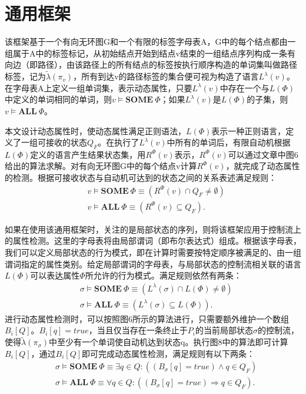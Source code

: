 \documentclass[UTF8]{article}
\begin{document}
\section{通用框架}
该框架基于一个有向无环图G和一个有限的标签字母表A，G中的每个结点都由一组属于A中的标签标记，从初始结点开始到结点v结束的一组结点序列构成一条有向边（即路径），由该路径上的所有结点的标签按执行顺序构造的单词集叫做路径标签，记为$ \tilde{\lambda}(\pi_v) $，所有到达v的路径标签的集合便可视为构造了语言$ L^{\lambda}(v) $。在字母表A上定义一组单词集，表示动态属性，只要$ L^{\lambda}(v) $中存在一个与$ L(\Phi) $中定义的单词相同的单词，则$ v \models \textbf{SOME} \ \Phi $；如果$ L^{\lambda}(v) $是$ L(\Phi) $的子集，则$ v \models \textbf{ALL} \ \Phi $。

本文设计动态属性时，使动态属性满足正则语法，$ L(\Phi) $表示一种正则语言，定义了一组可接收的状态$ Q_F $。在执行了$ L^{\lambda}(v) $中所有的单词后，有限自动机根据$ L(\Phi) $定义的语言产生结果状态集，用$ R^{\Phi}(v) $表示，$ R^{\Phi}(v) $可以通过文章中图6给出的算法求解。对有向无环图G中的每个结点v计算$ R^{\Phi}(v) $，就完成了动态属性的检测。根据可接收状态与自动机可达到的状态之间的关系表述满足规则：
$$
\begin{aligned}
	&v \models \textbf{SOME} \ \Phi \equiv (R^{\Phi}(v) \cap Q_F \neq \emptyset) \\
	&v \models \textbf{ALL} \ \Phi \equiv (R^{\Phi}(v) \subseteq Q_F).
\end{aligned}
$$

如果在使用该通用框架时，关注的是局部状态的序列，则将该框架应用于控制流上的属性检测。这里的字母表将由局部谓词（即布尔表达式）组成。根据该字母表，我们可以定义局部状态的行为模式，即在计算时需要按特定顺序被满足的、由一组谓词指定的属性类别。给定局部谓词的字母表，与局部状态的控制流相关联的语言$ L(\Phi) $可以表达属性$ \Phi $所允许的行为模式。满足规则依然有两条：
$$
\begin{aligned}
	&\sigma \models \textbf{SOME} \ \Phi \equiv (L^{\lambda}(\sigma) \cap L(\Phi) \neq \emptyset) \\
	&\sigma \models \textbf{ALL} \ \Phi \equiv (L^{\lambda}(\sigma) \subseteq L(\Phi)).
\end{aligned}
$$
进行动态属性检测时，可以按照图6所示的算法进行，只需要额外维护一个数组$ B_i[Q] $。$ B_i[q]=true $，当且仅当存在一条终止于$ P_i $的当前局部状态$ \sigma $的控制流，使得$ \tilde{\lambda}(\pi_{\sigma}) $中至少有一个单词使自动机达到状态q。执行图8中的算法即可计算$ B_i[Q] $，通过$ B_i[Q] $即可完成动态属性检测，满足规则有以下两条：
$$
\begin{aligned}
	&\sigma \models \textbf{SOME} \ \Phi \equiv \exists q\in Q:((B_{\sigma}[q]=true) \land q \in Q_F) \\
	&\sigma \models \textbf{ALL} \ \Phi \equiv \forall q\in Q:((B_{\sigma}[q]=true) \Rightarrow q \in Q_F).
\end{aligned}
$$
\end{document}
